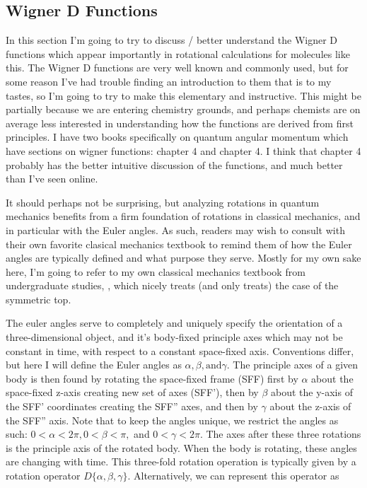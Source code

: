 \documentclass[prl, longbibliography]{revtex4-2}
\begin{document}
\subsection{Wigner D Functions}

In this section I'm going to try to discuss / better understand the Wigner D functions which appear importantly in rotational calculations for molecules like this. The Wigner D functions are very well known and commonly used, but for some reason I've had trouble finding an introduction to them that is to my tastes, so I'm going to try to make this elementary and instructive. This might be partially because we are entering chemistry grounds, and perhaps chemists are on average less interested in understanding how the functions are derived from first principles. I have two books specifically on quantum angular momentum which have sections on wigner functions: \cite{edmonds_angular_1960} chapter 4 and \cite{varshalovich_quantum_1988} chapter 4. I think that \cite{edmonds_angular_1960} chapter 4 probably has the better intuitive discussion of the functions, and much better than I've seen online.

It should perhaps not be surprising, but analyzing rotations in quantum mechanics benefits from a firm foundation of rotations in classical mechanics, and in particular with the Euler angles.
As such, readers may wish to consult with their own favorite clasical mechanics textbook to remind them of how the Euler angles are typically defined and what purpose they serve. 
Mostly for my own sake here, I'm going to refer to my own classical mechanics textbook from undergraduate studies, \cite{taylor_classical_2005}, which nicely treats (and only treats) the case of the symmetric top.

The euler angles serve to completely and uniquely specify the orientation of a three-dimensional object, and it's body-fixed principle axes which may not be constant in time, with respect to a constant space-fixed axis. Conventions differ, but here I will define the Euler angles as $\alpha, \beta, \text{and} \gamma$. The principle axes of a given body is then found by rotating the space-fixed frame (SFF) first by $\alpha$ about the space-fixed z-axis creating new set of axes (SFF'), then by $\beta$ about the y-axis of the SFF' coordinates creating the SFF'' axes, and then by $\gamma$ about the z-axis of the SFF'' axis. Note that to keep the angles unique, we restrict the angles as such: $0<\alpha<2\pi, 0<\beta<\pi,$ and $0<\gamma<2\pi$. The axes after these three rotations is the principle axis of the rotated body. When the body is rotating, these angles are changing with time. This three-fold rotation operation is typically given by a rotation operator $D\{\alpha,\beta,\gamma\}$. Alternatively, we can represent this operator as
\end{document}
